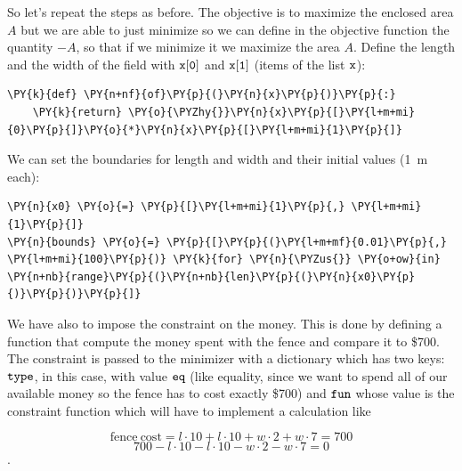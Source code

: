 So let's repeat the steps as before. The objective is to maximize the
enclosed area \(A\) but we are able to just minimize so we can define in the objective function the quantity \(-A\), so that if we minimize it
we maximize the area $A$. Define the length and the width of the field with \(\tt{x[0]}\) and
\(\tt{x[1]}\) (items of the list \(\tt{x}\)):

\begin{tcolorbox}[breakable, size=fbox, boxrule=1pt, pad at break*=1mm,colback=cellbackground, colframe=cellborder]
\begin{Verbatim}[commandchars=\\\{\}]
\PY{k}{def} \PY{n+nf}{of}\PY{p}{(}\PY{n}{x}\PY{p}{)}\PY{p}{:}
    \PY{k}{return} \PY{o}{\PYZhy{}}\PY{n}{x}\PY{p}{[}\PY{l+m+mi}{0}\PY{p}{]}\PY{o}{*}\PY{n}{x}\PY{p}{[}\PY{l+m+mi}{1}\PY{p}{]}
\end{Verbatim}
\end{tcolorbox}

We can set the boundaries for length and width and their initial values (1~m each):

\begin{tcolorbox}[breakable, size=fbox, boxrule=1pt, pad at break*=1mm,colback=cellbackground, colframe=cellborder]
\begin{Verbatim}[commandchars=\\\{\}]
\PY{n}{x0} \PY{o}{=} \PY{p}{[}\PY{l+m+mi}{1}\PY{p}{,} \PY{l+m+mi}{1}\PY{p}{]}
\PY{n}{bounds} \PY{o}{=} \PY{p}{[}\PY{p}{(}\PY{l+m+mf}{0.01}\PY{p}{,} \PY{l+m+mi}{100}\PY{p}{)} \PY{k}{for} \PY{n}{\PYZus{}} \PY{o+ow}{in} \PY{n+nb}{range}\PY{p}{(}\PY{n+nb}{len}\PY{p}{(}\PY{n}{x0}\PY{p}{)}\PY{p}{)}\PY{p}{]}
\end{Verbatim}
\end{tcolorbox}

We have also to impose the constraint on the money. This is done by
defining a function that compute the money spent with the fence and
compare it to \$700. The constraint is passed to the minimizer with a
dictionary which has two keys: \(\tt{type}\), in this case, with value \(\tt{eq}\)
(like equality, since we want to spend all of our available money so the
fence has to cost exactly \$700) and \(\tt{fun}\) whose value is the constraint function which will have to implement a calculation like

\[\mathrm{fence~cost} = l\cdot10 + l\cdot10 + w\cdot2 + w\cdot7 = 700\]
\[700 - l\cdot10 - l\cdot10 - w\cdot2 - w\cdot7 = 0\].

